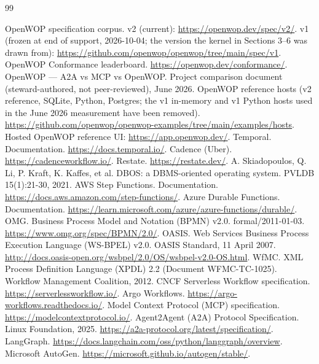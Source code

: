 \documentclass[11pt]{article}
\begin{document}
\begin{thebibliography}{99}
\raggedright  %
 OpenWOP specification corpus. v2 (current): \url{https://openwop.dev/spec/v2/}. v1 (frozen at end of support, 2026-10-04; the version the kernel in Sections 3--6 was drawn from): \url{https://github.com/openwop/openwop/tree/main/spec/v1}.
 OpenWOP Conformance leaderboard. \url{https://openwop.dev/conformance/}.
 OpenWOP --- A2A vs MCP vs OpenWOP. Project comparison document (steward-authored, not peer-reviewed), June 2026.
 OpenWOP reference hosts (v2 reference, SQLite, Python, Postgres; the v1 in-memory and v1 Python hosts used in the June 2026 measurement have been removed). \url{https://github.com/openwop/openwop-examples/tree/main/examples/hosts}.
 Hosted OpenWOP reference UI: \url{https://app.openwop.dev/}.
 Temporal. Documentation. \url{https://docs.temporal.io/}.
 Cadence (Uber). \url{https://cadenceworkflow.io/}.
 Restate. \url{https://restate.dev/}.
 A. Skiadopoulos, Q. Li, P. Kraft, K. Kaffes, et al. DBOS: a DBMS-oriented operating system. PVLDB 15(1):21-30, 2021.
 AWS Step Functions. Documentation. \url{https://docs.aws.amazon.com/step-functions/}.
 Azure Durable Functions. Documentation. \url{https://learn.microsoft.com/azure/azure-functions/durable/}.
 OMG. Business Process Model and Notation (BPMN) v2.0. formal/2011-01-03. \url{https://www.omg.org/spec/BPMN/2.0/}.
 OASIS. Web Services Business Process Execution Language (WS-BPEL) v2.0. OASIS Standard, 11 April 2007. \url{http://docs.oasis-open.org/wsbpel/2.0/OS/wsbpel-v2.0-OS.html}.
 WfMC. XML Process Definition Language (XPDL) 2.2 (Document WFMC-TC-1025). Workflow Management Coalition, 2012.
 CNCF Serverless Workflow specification. \url{https://serverlessworkflow.io/}.
 Argo Workflows. \url{https://argo-workflows.readthedocs.io/}.
 Model Context Protocol (MCP) specification. \url{https://modelcontextprotocol.io/}.
 Agent2Agent (A2A) Protocol Specification. Linux Foundation, 2025. \url{https://a2a-protocol.org/latest/specification/}.
 LangGraph. \url{https://docs.langchain.com/oss/python/langgraph/overview}.
 Microsoft AutoGen. \url{https://microsoft.github.io/autogen/stable/}.

\end{thebibliography}
\end{document}
